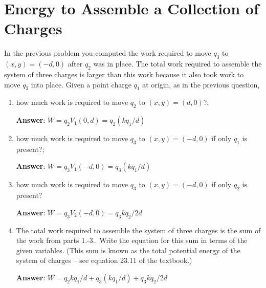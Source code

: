 \documentclass{article}
\begin{document}
\newpage

\section{Energy to Assemble a Collection of Charges}

In the previous problem you computed the work required to move $q_3$ to $(x,y) = (-d,0)$ after $q_2$ was in place. The total work required to assemble the system of three charges is larger than this work because it also took work to move $q_2$ into place. Given a point charge $q_1$ at origin, as in the previous question,

\begin{enumerate}

  \item how much work is required to move $q_2$ to $(x,y) = (d,0)$?;

        \ifsolutions
        \textbf{Answer}:
        $W = q_2V_1(0,d) = q_2(kq_1/d)$
        \else

        \vskip 36pt
        \fi

  \item how much work is required to move $q_3$ to $(x,y) = (-d,0)$ if only $q_1$ is present?;

        \ifsolutions
        \textbf{Answer}:
        $W = q_3V_1(-d,0) = q_3(kq_1/d)$
        \else

        \vskip 36pt
        \fi

  \item how much work is required to move $q_3$ to $(x,y) = (-d,0)$ if only $q_2$ is present?

        \ifsolutions
        \textbf{Answer}:
        $W=q_3V_2(-d,0)=q_3kq_2/2d$
        \else

        \vskip 36pt
        \fi

  \item The total work required to assemble the system of three charges is the sum of the work from parts 1.-3.. Write the equation for this sum in terms of the given variables. (This sum is known as the total potential energy of the system of charges -- see equation 23.11 of the textbook.)

        \ifsolutions
        \textbf{Answer}:
        $W=q_2kq_1/d +  q_3(kq_1/d) + q_3kq_2/2d$
        \fi

\end{enumerate}
\end{document}
